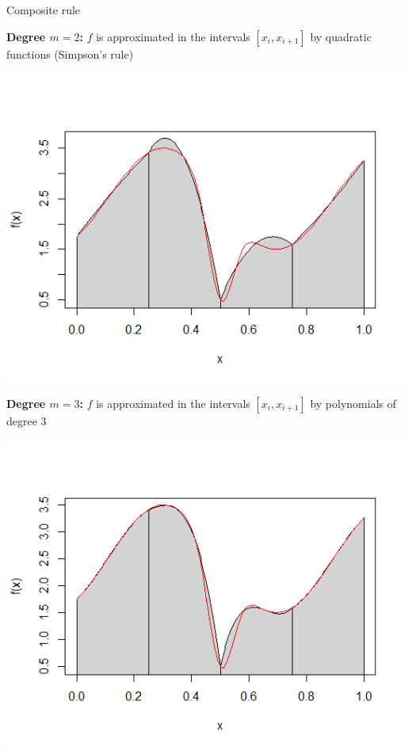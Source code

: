 \documentclass[11pt,compress,t,notes=noshow, xcolor=table]{beamer}
\begin{document}
\begin{vbframe}{Composite rule}



\framebreak

\textbf{Degree $m = 2$:} $f$ is approximated in the intervals $[x_i, x_{i + 1}]$ by quadratic functions (Simpson's rule)


\begin{center}
\includegraphics[width = .7\textwidth]{figure_man/deg2.png}
\end{center}


\framebreak

\textbf{Degree $m = 3$:} $f$ is approximated in the intervals $[x_i, x_{i + 1}]$ by polynomials of degree $3$

\begin{center}
\includegraphics[width = .7\textwidth]{figure_man/deg3.png}
\end{center}


\end{vbframe}
\end{document}
